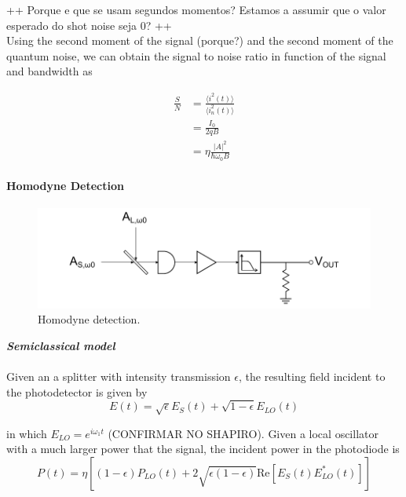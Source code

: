 \begin{bibunit}[plain]
++ Porque e que se usam segundos momentos? Estamos a assumir que o valor esperado do shot noise seja 0? ++
\\
Using the second moment of the signal (porque?) and the second moment of the quantum noise, we can obtain the signal to noise ratio in function of the signal and bandwidth as 


\begin{align}
	\frac{S}{N} &= \frac{\langle i^2(t) \rangle}{\langle i_n^2(t) \rangle} \nonumber\\
                &= \frac{I_0}{2 q B}\nonumber\\
                &= \eta \frac{ |A|^2}{\hbar \omega_0 B}
\end{align}




\paragraph{Homodyne Detection}
\begin{figure}[H]
	\centering
	\includegraphics{./sdf/optical_detection/figures/detection-homodyne.pdf}
	\caption{Homodyne detection.}
\end{figure}



{\bf \em Semiclassical model}\\
\\
Given an a splitter with intensity transmission $\epsilon$, the resulting field incident to the photodetector is given by
\cite{shapiro1985} %
\begin{equation}
	E(t) = \sqrt{\epsilon}E_S(t) + \sqrt{1-\epsilon}E_{LO}(t)
\end{equation}

in which $E_{LO} = e^{i \omega_1 t}$ (CONFIRMAR NO SHAPIRO). Given a local oscillator with a much larger power that the signal, the incident power in the photodiode is
\begin{equation}
	P(t) = \eta \left[ (1-\epsilon) P_{LO}(t) + 2 \sqrt{\epsilon (1-\epsilon)} \textrm{Re} \left[ E_S(t) E^\ast_{LO}(t) \right] \right]
\end{equation}


\end{bibunit}
